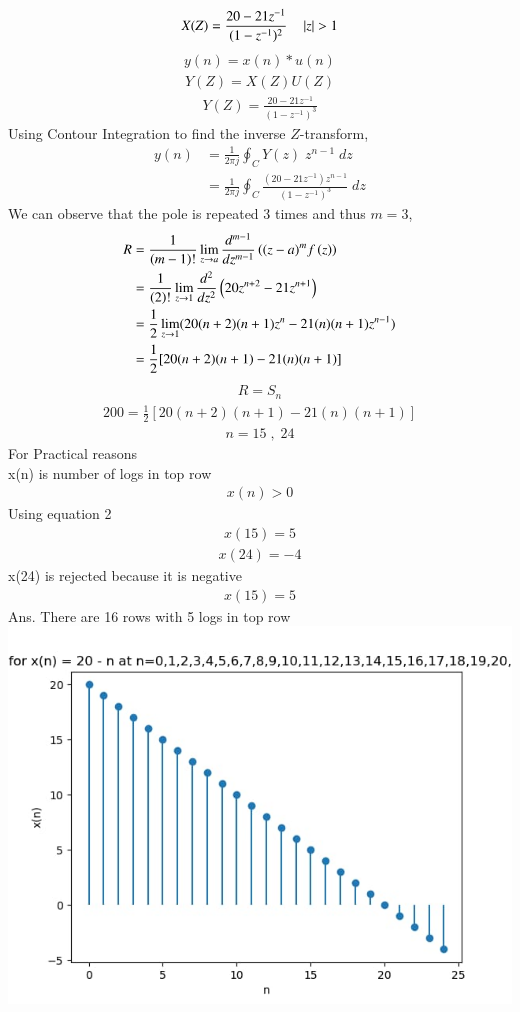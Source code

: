 \documentclass[journal,12pt,twocolumn]{IEEEtran}
\theoremstyle{remark}
\begin{document}
\begin{align} X(Z)=\frac{20-21z^{-1}}{(1 - z^{-1})^2}  \quad \left\vert z\right\vert > 1\end{align}
\begin{align}y(n) = x(n)*u(n)\end{align}
\begin{align}Y(Z) = X(Z)U(Z)\end{align}
\begin{align}Y(Z) = \frac{20-21z^{-1}}{(1 - z^{-1})^3}\end{align}
 Using Contour Integration to find the inverse $Z$-transform,
\begin{align}
    y(n)&=\frac{1}{2\pi j}\oint_{C}Y(z) \;z^{n-1} \;dz  \\
    &=\frac{1}{2\pi j}\oint_{C} \frac{(20-21z^{-1}) z^{n-1}}{(1 - z^{-1})^3} \;dz 
\end{align}
We can observe that the pole is repeated $3$ times and thus $m=3$,
\begin{align}
    R&=\frac{1}{\left(m-1\right)!}\lim\limits_{z\to a}\frac{d^{m-1}}{dz^{m-1}}\left({(z-a)}^{m}f\left(z\right)\right)  \\
    &=\frac{1}{\left(2\right)!}\lim\limits_{z\to 1}\frac{d^{2}}{dz^{2}}\left(20 z^{n+2}-21 z^{n+1}\right)   \\
    &=\frac{1}{2}\lim\limits_{z\to 1}(20(n+2)(n+1)z^{n}-21(n)(n+1)z^{n-1})   \\
    &=\frac{1}{2}[20(n+2)(n+1)-21(n)(n+1)]\end{align}
    \begin{align}
  R=S_n
\end{align}
 \begin{align}
  200=\frac{1}{2}[20(n+2)(n+1)-21(n)(n+1)]
\end{align}
\begin{align}n=15\; ,\;24\end{align}
For Practical reasons \\
x(n) is number of logs in top row
\begin{align}x(n)>0\end{align}
Using equation 2
\begin{align}x(15)=5\end{align}
\begin{align}x(24)=-4 \end{align}
x(24) is rejected because it is negative
\begin{align}x(15)=5\end{align}
Ans. There are 16 rows with 5 logs in top row
\includegraphics[width=2\linewidth]{figs/f2.png}\\\\
\end{document}
